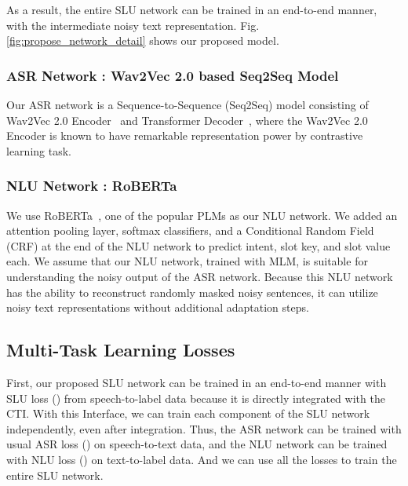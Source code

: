 \documentclass{article}
\newcommand{\asr}{Wav2Vec 2.0 based Seq2Seq Model}
\newcommand{\nlu}{RoBERTa}
\begin{document}
As a result, the entire SLU network can be trained in an end-to-end manner, with the intermediate noisy text representation.
Fig. \ref{fig:propose_network_detail} shows our proposed model.


\vspace{-4mm}
\subsubsection{ASR Network : \asr{}}
Our ASR network is a Sequence-to-Sequence (Seq2Seq) model consisting of Wav2Vec 2.0 Encoder~\cite{baevski2020wav2vec} and Transformer Decoder~\cite{vaswani2017attention}, where the Wav2Vec 2.0 Encoder is known to have remarkable representation power by contrastive learning task. 


\vspace{-4mm}
\subsubsection{NLU Network : \nlu}
We use \nlu{}~\cite{liu2019roberta}, one of the popular PLMs as our NLU network. 
We added an attention pooling layer, softmax classifiers, and a Conditional Random Field (CRF) at the end of the NLU network to predict intent, slot key, and slot value each.
We assume that our NLU network, trained with MLM, is suitable for understanding the noisy output of the ASR network.
Because this NLU network has the ability to reconstruct randomly masked noisy sentences, it can utilize noisy text representations without additional adaptation steps.



\vspace{-4mm}
\subsection{Multi-Task Learning Losses}

First, our proposed SLU network can be trained in an end-to-end manner with SLU loss () from speech-to-label data because it is directly integrated with the CTI.
With this Interface, we can train each component of the SLU network independently, even after integration. 
Thus, the ASR network can be trained with usual ASR loss () on speech-to-text data, and the NLU network can be trained with NLU loss () on text-to-label data.
And we can use all the losses to train the entire SLU network.

\vspace{-4mm}
\end{document}

